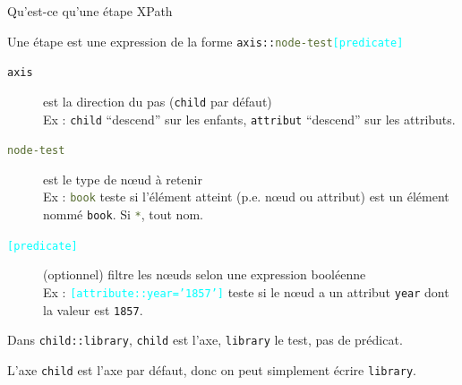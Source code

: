 \begin{frame}{Qu'est-ce qu'une \alert{étape} XPath}

Une \alert{étape}  est une expression de la forme 
\texttt{\textcolor{indiaRed}{axis}::\textcolor{DarkOliveGreen}{node-test}\textcolor{cyan}{[predicate]}
}\\


\begin{description}
\item[\texttt{\textcolor{indiaRed}{axis}}] est la direction du pas (\texttt{\textcolor{indiaRed}{child}}  par défaut)\\
Ex : \texttt{\textcolor{indiaRed}{child}} ``descend'' sur les enfants, \texttt{\textcolor{indiaRed}{attribut}} ``descend'' sur les attributs.
\item[\texttt{\textcolor{DarkOliveGreen}{node-test}}] est le type de nœud à retenir\\
Ex : \texttt{\textcolor{DarkOliveGreen}{book}} teste si l'élément atteint (p.e. nœud ou attribut) est un élément nommé \texttt{book}.
Si \texttt{\textcolor{DarkOliveGreen}{*}},  tout nom.
\item[\texttt{\textcolor{cyan}{[predicate]}}] (optionnel) filtre les nœuds selon une expression booléenne \\
	Ex : \texttt{\textcolor{cyan}{[attribute::year='1857']}} teste si le nœud a un attribut \texttt{year} dont la valeur est \texttt{1857}.\\
\end{description}

\medskip

Dans \texttt{child::library}, \texttt{child} est l'axe, \texttt{library} le test,  pas de prédicat. 

\begin{remark}
L'axe \texttt{child} est l'axe par défaut, donc on peut simplement écrire \texttt{library}.
\end{remark}
\end{frame}


